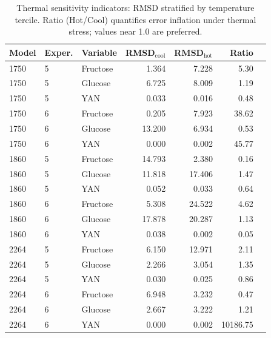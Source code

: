 \begin{table}[H]\centering
\small
\caption{Thermal sensitivity indicators: RMSD stratified by temperature tercile. 
Ratio (Hot/Cool) quantifies error inflation under thermal stress; values near 1.0 
are preferred.}
\label{tab:SI_X_3_thermal_sensitivity}
\begin{tabular}{lllrrrr}
\toprule
\textbf{Model} & \textbf{Exper.} & \textbf{Variable} & \textbf{RMSD$_{\mathrm{cool}}$} & 
\textbf{RMSD$_{\mathrm{hot}}$} & \textbf{Ratio} \\
\midrule
1750 & 5 & Fructose &           1.364 &           7.228 &     5.30 \\
1750 & 5 & Glucose &           6.725 &           8.009 &     1.19 \\
1750 & 5 & YAN &           0.033 &           0.016 &     0.48 \\
1750 & 6 & Fructose &           0.205 &           7.923 &    38.62 \\
1750 & 6 & Glucose &          13.200 &           6.934 &     0.53 \\
1750 & 6 & YAN &           0.000 &           0.002 &    45.77 \\
1860 & 5 & Fructose &          14.793 &           2.380 &     0.16 \\
1860 & 5 & Glucose &          11.818 &          17.406 &     1.47 \\
1860 & 5 & YAN &           0.052 &           0.033 &     0.64 \\
1860 & 6 & Fructose &           5.308 &          24.522 &     4.62 \\
1860 & 6 & Glucose &          17.878 &          20.287 &     1.13 \\
1860 & 6 & YAN &           0.038 &           0.002 &     0.05 \\
2264 & 5 & Fructose &           6.150 &          12.971 &     2.11 \\
2264 & 5 & Glucose &           2.266 &           3.054 &     1.35 \\
2264 & 5 & YAN &           0.030 &           0.025 &     0.86 \\
2264 & 6 & Fructose &           6.948 &           3.232 &     0.47 \\
2264 & 6 & Glucose &           2.667 &           3.222 &     1.21 \\
2264 & 6 & YAN &           0.000 &           0.002 & 10186.75 \\
\bottomrule
\end{tabular}
\end{table}

